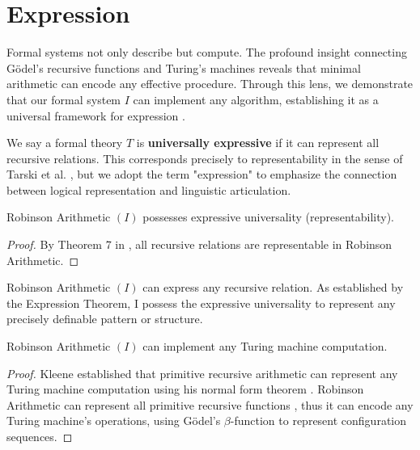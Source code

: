 \documentclass[runningheads]{llncs}
\begin{document}
	
	\section{Expression}
	
	Formal systems not only describe but compute. The profound insight connecting Gödel's recursive functions and Turing's machines reveals that minimal arithmetic can encode any effective procedure. Through this lens, we demonstrate that our formal system $I$ can implement any algorithm, establishing it as a universal framework for expression \cite{Godel1931} \cite{Turing1936}.
	
	\begin{definition}
        We say a formal theory $T$ is \textbf{universally expressive} if it can represent all recursive relations. This corresponds precisely to representability in the sense of Tarski et al. \cite{TarskiMostowskiRobinson1953}, but we adopt the term "expression" to emphasize the connection between logical representation and linguistic articulation.
    \end{definition}
    
    \medskip
    
    \begin{theorem}
        Robinson Arithmetic $(I)$ possesses expressive universality (representability).
    \end{theorem}
    
    \begin{proof}
        By Theorem 7 in \cite{TarskiMostowskiRobinson1953}, all recursive relations are representable in Robinson Arithmetic.
    \end{proof}

    \medskip

    \begin{corollary}
        Robinson Arithmetic $(I)$ can express any recursive relation. As established by the Expression Theorem, I possess the expressive universality to represent any precisely definable pattern or structure.
    \end{corollary}
    
    \medskip
	
	\begin{theorem}
        Robinson Arithmetic $(I)$ can implement any Turing machine computation.
    \end{theorem}
    
    \begin{proof}
        Kleene established that primitive recursive arithmetic can represent any Turing machine computation using his normal form theorem \cite[Chapter 10]{Kleene1952}. Robinson Arithmetic can represent all primitive recursive functions \cite[Theorem 7]{TarskiMostowskiRobinson1953}, thus it can encode any Turing machine's operations, using Gödel's $\beta$-function \cite[p. 180]{Godel1931} to represent configuration sequences.
    \end{proof}
	
\end{document}
